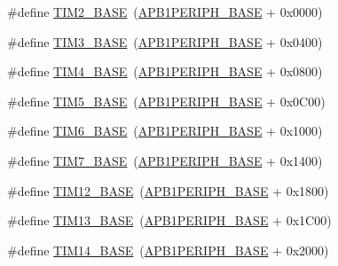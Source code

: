 \begin{DoxyCompactItemize}
\item 
\#define \mbox{\hyperlink{group___peripheral__memory__map_ga00d0fe6ad532ab32f0f81cafca8d3aa5}{T\+I\+M2\+\_\+\+B\+A\+SE}}~(\mbox{\hyperlink{group___peripheral__memory__map_ga45666d911f39addd4c8c0a0ac3388cfb}{A\+P\+B1\+P\+E\+R\+I\+P\+H\+\_\+\+B\+A\+SE}} + 0x0000)
\item 
\#define \mbox{\hyperlink{group___peripheral__memory__map_gaf0c34a518f87e1e505cd2332e989564a}{T\+I\+M3\+\_\+\+B\+A\+SE}}~(\mbox{\hyperlink{group___peripheral__memory__map_ga45666d911f39addd4c8c0a0ac3388cfb}{A\+P\+B1\+P\+E\+R\+I\+P\+H\+\_\+\+B\+A\+SE}} + 0x0400)
\item 
\#define \mbox{\hyperlink{group___peripheral__memory__map_ga56e2d44b0002f316527b8913866a370d}{T\+I\+M4\+\_\+\+B\+A\+SE}}~(\mbox{\hyperlink{group___peripheral__memory__map_ga45666d911f39addd4c8c0a0ac3388cfb}{A\+P\+B1\+P\+E\+R\+I\+P\+H\+\_\+\+B\+A\+SE}} + 0x0800)
\item 
\#define \mbox{\hyperlink{group___peripheral__memory__map_ga3e1671477190d065ba7c944558336d7e}{T\+I\+M5\+\_\+\+B\+A\+SE}}~(\mbox{\hyperlink{group___peripheral__memory__map_ga45666d911f39addd4c8c0a0ac3388cfb}{A\+P\+B1\+P\+E\+R\+I\+P\+H\+\_\+\+B\+A\+SE}} + 0x0\+C00)
\item 
\#define \mbox{\hyperlink{group___peripheral__memory__map_ga8268ec947929f192559f28c6bf7d1eac}{T\+I\+M6\+\_\+\+B\+A\+SE}}~(\mbox{\hyperlink{group___peripheral__memory__map_ga45666d911f39addd4c8c0a0ac3388cfb}{A\+P\+B1\+P\+E\+R\+I\+P\+H\+\_\+\+B\+A\+SE}} + 0x1000)
\item 
\#define \mbox{\hyperlink{group___peripheral__memory__map_ga0ebf54364c6a2be6eb19ded6b18b6387}{T\+I\+M7\+\_\+\+B\+A\+SE}}~(\mbox{\hyperlink{group___peripheral__memory__map_ga45666d911f39addd4c8c0a0ac3388cfb}{A\+P\+B1\+P\+E\+R\+I\+P\+H\+\_\+\+B\+A\+SE}} + 0x1400)
\item 
\#define \mbox{\hyperlink{group___peripheral__memory__map_ga33dea32fadbaecea161c2ef7927992fd}{T\+I\+M12\+\_\+\+B\+A\+SE}}~(\mbox{\hyperlink{group___peripheral__memory__map_ga45666d911f39addd4c8c0a0ac3388cfb}{A\+P\+B1\+P\+E\+R\+I\+P\+H\+\_\+\+B\+A\+SE}} + 0x1800)
\item 
\#define \mbox{\hyperlink{group___peripheral__memory__map_gad20f79948e9359125a40bbf6ed063590}{T\+I\+M13\+\_\+\+B\+A\+SE}}~(\mbox{\hyperlink{group___peripheral__memory__map_ga45666d911f39addd4c8c0a0ac3388cfb}{A\+P\+B1\+P\+E\+R\+I\+P\+H\+\_\+\+B\+A\+SE}} + 0x1\+C00)
\item 
\#define \mbox{\hyperlink{group___peripheral__memory__map_ga862855347d6e1d92730dfe17ee8e90b8}{T\+I\+M14\+\_\+\+B\+A\+SE}}~(\mbox{\hyperlink{group___peripheral__memory__map_ga45666d911f39addd4c8c0a0ac3388cfb}{A\+P\+B1\+P\+E\+R\+I\+P\+H\+\_\+\+B\+A\+SE}} + 0x2000)

\end{DoxyCompactItemize}
